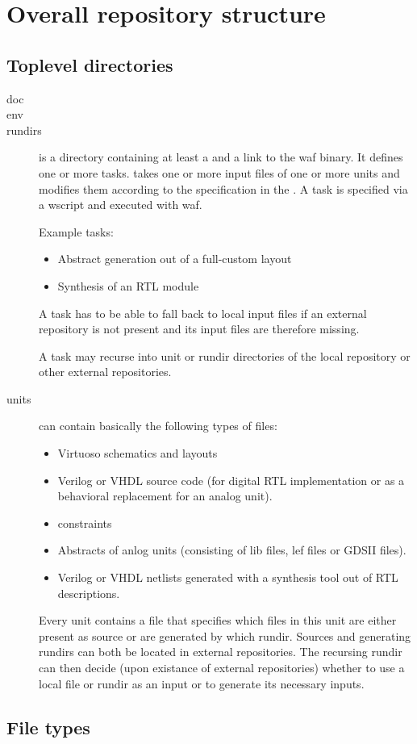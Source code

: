 \chapter{Overall repository structure}
\section{Toplevel directories}
\begin{description}%
	\item[doc]
	\item[env]
	\item[rundirs]
		is a directory containing at least a  and a link to the waf binary. It defines one or more tasks.
		takes one or more input files of one or more units and modifies them
		according to the specification in the .
		A task is specified via a wscript and executed with waf.

		Example tasks:
		\begin{itemize}
			\item Abstract generation out of a full-custom layout 
			\item Synthesis of an RTL module
		\end{itemize}

		A task has to be able to fall back to local input files if an external repository is not present and its input files are therefore missing.

		A task may recurse into unit or rundir directories of the local repository or other external repositories.

	\item[units]
		can contain basically the following types of files:
		\begin{itemize}
			\item Virtuoso schematics and layouts
			\item Verilog or VHDL source code (for digital RTL implementation or as a behavioral replacement for an analog unit).
			\item constraints
			\item Abstracts of anlog units (consisting of lib files, lef files or GDSII files).
			\item Verilog or VHDL netlists generated with a synthesis tool out of RTL descriptions.
		\end{itemize}

		Every unit contains a file that specifies which files in this unit are either present as source or are generated by which rundir.
		Sources and generating rundirs can both be located in external repositories.
		The recursing rundir can then decide (upon existance of external repositories) whether to use a local file or rundir as an input or to generate its necessary inputs.
\end{description}

\section{File types}
